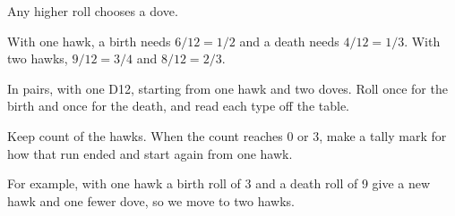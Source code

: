 \vspace{0.9cm}

{\large Any higher roll chooses a dove.}

\vspace{0.6cm}

\ifanswers
{\small\color{inkgrey} With one hawk, a birth needs \(6/12 = 1/2\) and a death
needs \(4/12 = 1/3\). With two hawks, \(9/12 = 3/4\) and \(8/12 = 2/3\).}
\fi

\newpage
{}

\vspace{0.4cm}

{\Large In pairs, with one D12, starting from one hawk and two doves. Roll once
for the birth and once for the death, and read each type off the table.}

\vspace{0.7cm}

\begin{center}
\end{center}

\vspace{0.6cm}

{\Large Keep count of the hawks. When the count reaches 0 or 3, make a tally mark
for how that run ended and start again from one hawk.}

\vspace{0.6cm}

{\large\color{inkgrey} For example, with one hawk a birth roll of 3 and a death
roll of 9 give a new hawk and one fewer dove, so we move to two hawks.}
\newpage
{}

\vspace{0.2cm}

